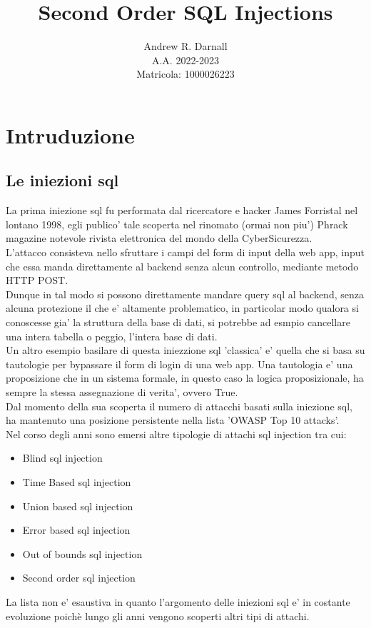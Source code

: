 \documentclass{book}
\title{Second Order SQL Injections}
\author{Andrew R. Darnall \\ A.A. 2022-2023 \\ Matricola: 1000026223}
\begin{document}
\maketitle
\tableofcontents
\chapter{Intruduzione}
\section{Le iniezioni sql}
La prima iniezione sql fu performata dal ricercatore e hacker James Forristal nel
lontano 1998, egli publico' tale scoperta nel rinomato (ormai non piu') Phrack magazine
notevole rivista elettronica del mondo della CyberSicurezza.
\\
L'attacco consisteva nello sfruttare i campi del form di input della web app, input che 
essa manda direttamente al backend senza alcun controllo, mediante metodo HTTP POST.
\\
Dunque in tal modo si possono direttamente mandare query sql al backend, senza alcuna protezione
il che e' altamente problematico, in particolar modo qualora si conoscesse gia' la struttura 
della base di dati, si potrebbe ad esmpio cancellare una intera tabella o peggio, l'intera base di dati.
\\
Un altro esempio basilare di questa iniezzione sql 'classica' e' quella che si basa su 
tautologie per bypassare il form di login di una web app.
Una tautologia e' una proposizione che in un sistema formale, in questo caso la logica proposizionale,
ha sempre la stessa assegnazione di verita', ovvero True.
\\
Dal momento della sua scoperta il numero di attacchi basati sulla iniezione sql, ha mantenuto
una posizione persistente nella lista 'OWASP Top 10 attacks'.
\\
Nel corso degli anni sono emersi altre tipologie di attachi sql injection tra cui:
\\
\begin{itemize}
    \item Blind sql injection
    \item Time Based sql injection
    \item Union based sql injection
    \item Error based sql injection
    \item Out of bounds sql injection
    \item Second order sql injection
\end{itemize}
La lista non e' esaustiva in quanto l'argomento delle iniezioni sql e' in costante evoluzione poichè lungo gli anni vengono
scoperti altri tipi di attachi.
\\
\end{document}
